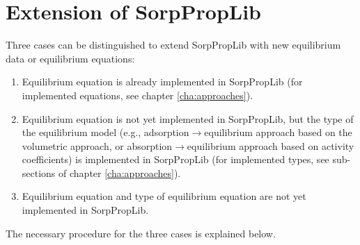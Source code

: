 \chapter{Extension of SorpPropLib}
\label{cha:extensions}
%
Three cases can be distinguished to extend SorpPropLib with new equilibrium data or equilibrium equations:
\begin{enumerate}
	\item Equilibrium equation is already implemented in SorpPropLib (for implemented equations, see chapter \ref{cha:approaches}).
	\item Equilibrium equation is not yet implemented in SorpPropLib, but the type of the equilibrium model (e.g., adsorption$\rightarrow$equilibrium approach based on the volumetric approach, or absorption$\rightarrow$equilibrium approach based on activity coefficients) is implemented in SorpPropLib (for implemented types, see sub-sections of chapter \ref{cha:approaches}).
	\item Equilibrium equation and type of equilibrium equation are not yet implemented in SorpPropLib.
\end{enumerate}
The necessary procedure for the three cases is explained below.

